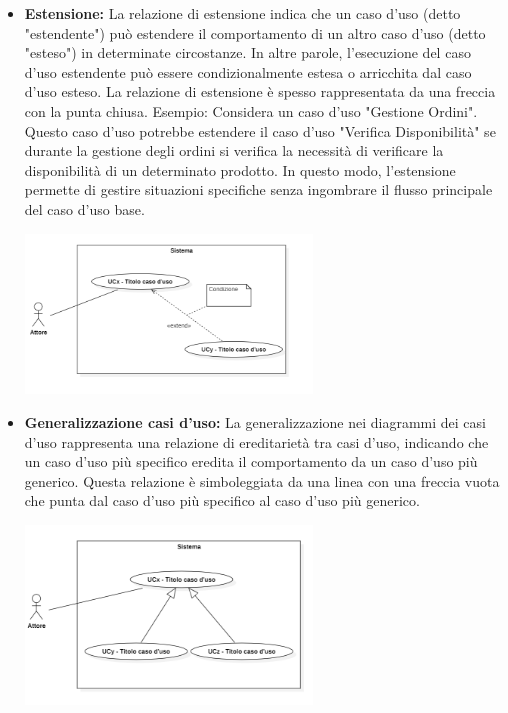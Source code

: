 \begin{itemize}
\begin{itemize}
        \item \textbf{Estensione:}
        La relazione di estensione indica che un caso d'uso (detto "estendente") può estendere il comportamento di un altro caso d'uso (detto "esteso") in determinate circostanze. In altre parole, l'esecuzione del caso d'uso estendente può essere condizionalmente estesa o arricchita dal caso d'uso esteso. La relazione di estensione è spesso rappresentata da una freccia con la punta chiusa.
        Esempio: Considera un caso d'uso "Gestione Ordini". Questo caso d'uso potrebbe estendere il caso d'uso "Verifica Disponibilità" se durante la gestione degli ordini si verifica la necessità di verificare la disponibilità di un determinato prodotto. In questo modo, l'estensione permette di gestire situazioni specifiche senza ingombrare il flusso principale del caso d'uso base.
        \begin{minipage}[t]{\linewidth}
            \centering
            \includegraphics[width=0.6\textwidth]{../Images/NormeDiProgetto/Estensione.PNG}
        \end{minipage}

        \item \textbf{Generalizzazione casi d'uso:}
        La generalizzazione nei diagrammi dei casi d'uso rappresenta una relazione di ereditarietà tra casi d'uso, indicando che un caso d'uso più specifico eredita il comportamento da un caso d'uso più generico. Questa relazione è simboleggiata da una linea con una freccia vuota che punta dal caso d'uso più specifico al caso d'uso più generico.
        \begin{minipage}[t]{\linewidth}
            \centering
            \includegraphics[width=0.6\textwidth]{../Images/NormeDiProgetto/GeneralizzazioneUC.PNG}
        \end{minipage}
    \end{itemize}

\end{itemize}

